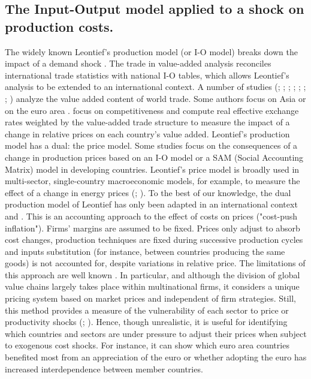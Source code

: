 \documentclass[11pt,a4paper]{article}
\begin{document}
\subsection{The Input-Output model applied to a shock on production costs.}
\label{subsec:io}
The widely known Leontief's production model (or I-O model) breaks down the impact of a demand shock \citep{LeontiefstructureAmericaneconomy1951}. The trade in value-added analysis reconciles international trade statistics with national I-O tables, which allows Leontief's analysis to be extended to an international context. A number of studies (\cite{HummelsVerticalSpecializationWorldTrade2001}; \cite{Daudincommerceexterieurvaleur2006}; \cite{DaudinWhoproduceswhom2011}; \cite{DeBackerInternationalComparativeEvidence2012};  \cite{JohnsonAccountingintermediatesProduction2012} ; \cite{KoopmanTracingvalueaddeddouble2014} ; \cite{AmadorGlobalvaluechains2015}; \cite{LosComment2016}) analyze the value added content of world trade. Some authors focus on Asia \citep{Sato2014} or on the euro area \citep{CapparielloHowdoesforeign2015}. \cite{BemsDemandValueAdded2015} focus on competitiveness and compute real effective exchange rates weighted by the value-added trade structure to measure the impact of a change in relative prices on each country's value added.
Leontief's production model has a dual: the price model. Some studies focus on the consequences of a change in production prices based on an I-O model or a SAM (Social Accounting Matrix) model in developing countries. Leontief's price model is broadly used in multi-sector, single-country macroeconomic models, for example, to measure the effect of a change in energy prices (\cite{Bournaycomptabilitenationale2015}; \cite{Sharify2013}). To the best of our knowledge, the dual production model of Leontief has only been adapted in an international context \cite{Cochard2016} and \cite{Auer2017}. 
This is an accounting approach to the effect of costs on prices ("cost-push inflation"). Firms' margins are assumed to be fixed. Prices only adjust to absorb cost changes, production techniques are fixed during successive production cycles and inputs substitution (for instance, between countries producing the same goods) is not accounted for, despite variations in relative price. The limitations of this approach are well known \citep{Folloni1994}. In particular, and although the division of global value chains largely takes place within multinational firms, it considers a unique pricing system based on market prices and independent of firm strategies. Still, this method provides a measure of the vulnerability of each sector to price or productivity shocks (\cite{AcemogluNetworkOriginsAggregate2012}; \cite{Carvalhomicromacroproduction2014}). Hence, though unrealistic, it is useful for identifying which countries and sectors are under pressure to adjust their prices when subject to exogenous cost shocks. For instance, it can show which euro area countries benefited most from an appreciation of the euro or whether adopting the euro has increased interdependence between member countries.
\end{document}
